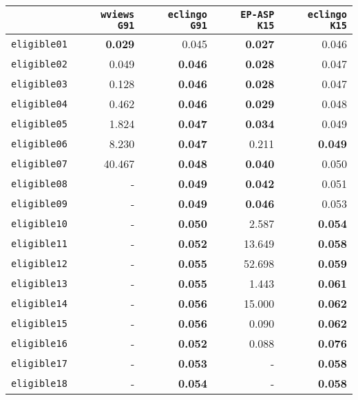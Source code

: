 \documentclass{new_tlp}
\def\wviews{{\tt \wviews}}
\def\wviews{{\tt wviews}}
\def\EPASP{{\tt EP-ASP}}
\begin{document}
\begin{table}[ht]
    \begin{tabular}{c|rr|rr}
    \hline
    & \texttt{\wviews{} G91} & \texttt{eclingo G91} & \texttt{\EPASP{} K15} & \texttt{eclingo K15} \\ \hline
    \texttt{eligible01} & {\bf 0.029}      & 0.045       & {\bf 0.027}      & 0.046       \\
    \texttt{eligible02} & 0.049      & {\bf 0.046}       & {\bf 0.028}      & 0.047       \\
    \texttt{eligible03} & 0.128      & {\bf 0.046}       & {\bf 0.028}      & 0.047       \\
    \texttt{eligible04} & 0.462      & {\bf 0.046}       & {\bf 0.029}      & 0.048       \\
    \texttt{eligible05} & 1.824      & {\bf 0.047}       & {\bf 0.034}      & 0.049       \\
    \texttt{eligible06} & 8.230      & {\bf 0.047}       & 0.211      & {\bf 0.049}       \\
    \texttt{eligible07} & 40.467     & {\bf 0.048}       & {\bf 0.040}      & 0.050       \\
    \texttt{eligible08} & -          & {\bf 0.049}       & {\bf 0.042}      & 0.051       \\
    \texttt{eligible09} & -          & {\bf 0.049}       & {\bf 0.046}       & 0.053       \\
    \texttt{eligible10} & -          & {\bf 0.050}       & 2.587      & {\bf 0.054}       \\
    \texttt{eligible11} & -          & {\bf 0.052}       & 13.649     & {\bf 0.058}       \\
    \texttt{eligible12} & -          & {\bf 0.055}       & 52.698     & {\bf 0.059}       \\
    \texttt{eligible13} & -          & {\bf 0.055}       & 1.443      & {\bf 0.061}       \\
    \texttt{eligible14} & -          & {\bf 0.056}       & 15.000     & {\bf 0.062}      \\
    \texttt{eligible15} & -          & {\bf 0.056}       & 0.090      & {\bf 0.062}       \\
    \texttt{eligible16} & -          & {\bf 0.052}       & 0.088      & {\bf 0.076}       \\
    \texttt{eligible17} & -          & {\bf 0.053}       & -          & {\bf 0.058}       \\
    \texttt{eligible18} & -          & {\bf 0.054}       & -          & {\bf 0.058}       \\

\end{tabular}
\end{table}
\end{document}
